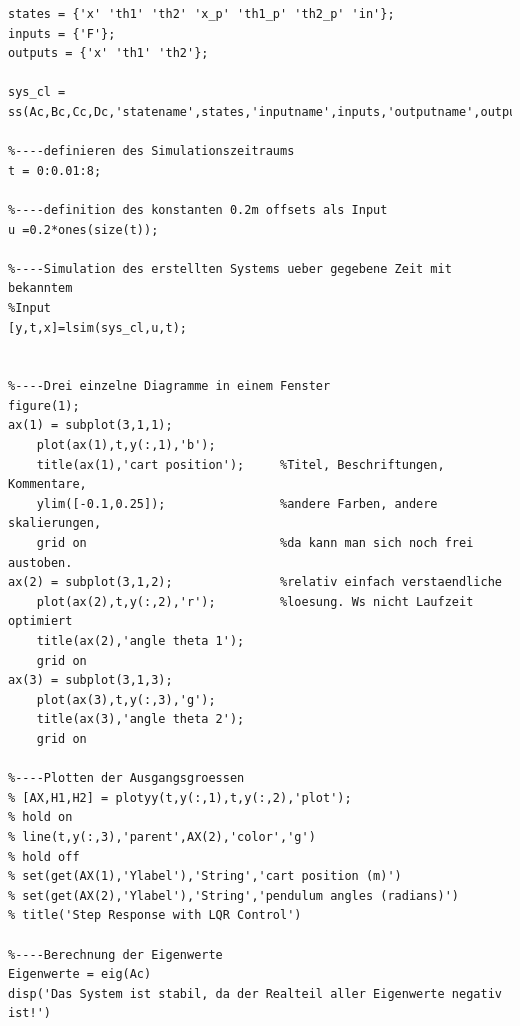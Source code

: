 \documentclass[a4paper, 10pt]{report}
\begin{document}
\begin{lstlisting}
states = {'x' 'th1' 'th2' 'x_p' 'th1_p' 'th2_p' 'in'};
inputs = {'F'};
outputs = {'x' 'th1' 'th2'};

sys_cl = ss(Ac,Bc,Cc,Dc,'statename',states,'inputname',inputs,'outputname',outputs);

%----definieren des Simulationszeitraums
t = 0:0.01:8;

%----definition des konstanten 0.2m offsets als Input
u =0.2*ones(size(t));

%----Simulation des erstellten Systems ueber gegebene Zeit mit bekanntem
%Input
[y,t,x]=lsim(sys_cl,u,t);


%----Drei einzelne Diagramme in einem Fenster
figure(1);
ax(1) = subplot(3,1,1);
    plot(ax(1),t,y(:,1),'b');
    title(ax(1),'cart position');     %Titel, Beschriftungen, Kommentare,
    ylim([-0.1,0.25]);                %andere Farben, andere skalierungen,
    grid on                           %da kann man sich noch frei austoben.
ax(2) = subplot(3,1,2);               %relativ einfach verstaendliche 
    plot(ax(2),t,y(:,2),'r');         %loesung. Ws nicht Laufzeit optimiert
    title(ax(2),'angle theta 1');
    grid on
ax(3) = subplot(3,1,3);
    plot(ax(3),t,y(:,3),'g');
    title(ax(3),'angle theta 2');
    grid on

%----Plotten der Ausgangsgroessen
% [AX,H1,H2] = plotyy(t,y(:,1),t,y(:,2),'plot');
% hold on
% line(t,y(:,3),'parent',AX(2),'color','g')
% hold off
% set(get(AX(1),'Ylabel'),'String','cart position (m)')
% set(get(AX(2),'Ylabel'),'String','pendulum angles (radians)')
% title('Step Response with LQR Control')

%----Berechnung der Eigenwerte
Eigenwerte = eig(Ac)
disp('Das System ist stabil, da der Realteil aller Eigenwerte negativ ist!')
\end{lstlisting}
\end{document}
